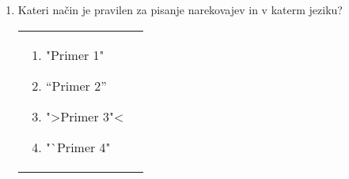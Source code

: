 \documentclass[11pt]{article}
\begin{document}
\begin{enumerate}
\begin{enumerate}
{                Sed ac justo commodo, fringilla urna ac, efficitur leo. Praesent dui odio, accumsan ac sapien nec, interdum volutpat est. 
            }
            \item {
                Lorem ipsum dolor sit amet, consectetur adipiscing elit. Ut id viverra ligula. Phasellus vehicula lorem vitae luctus dignissim. \\
                Sed ac justo commodo, fringilla urna ac, efficitur leo. Praesent dui odio, accumsan ac sapien nec, interdum volutpat est. 
            }
            \item {
                Lorem ipsum dolor sit amet, consectetur adipiscing elit. Ut id viverra ligula. Phasellus vehicula lorem vitae luctus dignissim. \par
                Sed ac justo commodo, fringilla urna ac, efficitur leo. Praesent dui odio, accumsan ac sapien nec, interdum volutpat est. 
            }
        \end{enumerate}
    
      \item Kateri način je pravilen za pisanje narekovajev in v katerm jeziku? %
      \begin{table}
        \centering
        \begin{tabular}{ll}
      \begin{enumerate}
            \item "Primer 1"
            \item ``Primer 2''
            \item ">Primer 3"<
            \item "`Primer 4"
        \end{enumerate}
      \end{tabular}
    \end{table}
\end{enumerate}
\end{document}
